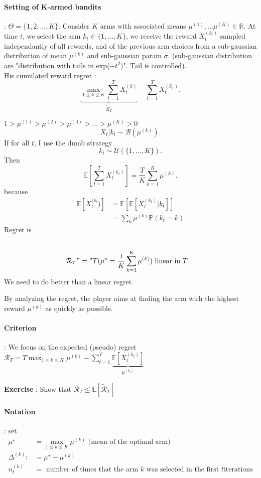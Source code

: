 \paragraph*{Setting of K-armed bandits} : $\Theta = \{1,2, \dots ,K\}$. Consider $K$ arms with associated means $\mu ^{(1)}, \dots \mu ^{(K)} \in \mathbb{R}$.
At time $ t $, we select the arm $ k_t \in \{1, \dots, K\} $, we receive the reward $ X_t ^{(k_t)} $ sampled independantly of all rewards, and of the previous arm choices from a sub-gaussian distribution of mean $ \mu ^{(k)} $ and sub-gaussian param $ \sigma  $. (sub-gaussian distribution are "distribution with tails in exp($-t^2$)". Tail is controlled). \\
His cumulated reward regret : 
\[
    \underbrace{\max _{1 \leq k \leq K} \sum_{t=1}^{T} X^{(k)}_t}_{\tilde{\mathcal{R}}_T} - \sum_{t=1}^{T} X^{(k_T)}_t
.\]

$1 > \mu ^{(1)} > \mu ^{(2)} > \mu ^{(3)} > \dots > \mu ^{(K)} > 0 $ 
\[
    X_t | k_t \sim \mathcal{B}(\mu ^{(k)})
.\]
If for all $ t $, I use the dumb strategy 
\[
    k_t \sim \mathcal{U}(\{1, \dots, K\})
.\]
Then 
\[
    \mathbb{E}[ \sum_{t=1}^{T} X_t ^{(k_t)}] = \frac{T}{K}\sum_{k=1}^{K}\mu ^{(k)}
.\]
because
\begin{align*}
    \mathbb{E}[X_t ^{(k_t})] &= \mathbb{E} [ \mathbb{E}[X_t^{(k_t)} | k_t] ] \\
        &= \sum_{k} \mu ^{(k)} \mathbb{P}(k_t = k )
\end{align*}
Regret is 
\begin{align*}
     \\
    \mathcal{R}_T "&=" T (\mu ^\star = \frac{1}{K} \sum_{k=1}^{K} \mu ^{(k)}) \text{ linear in } T
\end{align*}
We need to do better than a linear regret.

By analyzing the regret, the player aims at finding the arm wirh the highest reward $\mu ^{(k)} $ as quickly as possible.

\paragraph{Criterion}: We focus on the expected (pseudo) regret $ \mathcal{R}_T = T \max _{1 \leq k \leq K} \mu^{(k)} - \sum_{t=1}^{T} \underbrace{\mathbb{E}[X^{(k_t)}_t]}_{\mu ^(k_t)}  $

\textbf{Exercise} : Show that $\mathcal{R}_T \leq \mathbb{E}[\tilde{\mathcal{R}}_T]$

\paragraph{Notation}: set 
\begin{align*}
    \mu ^\star &= \max _{1 \leq k \leq K} \mu ^{(k)} \text{ (mean of the optimal arm)} \\
    \Delta ^{(k)} :&= \mu ^\star - \mu ^{(k)} \\
    n_t^{(k)} &= \text{ number of times that the arm } k \text{ was selected in the first } t \text{iterations}
\end{align*}

